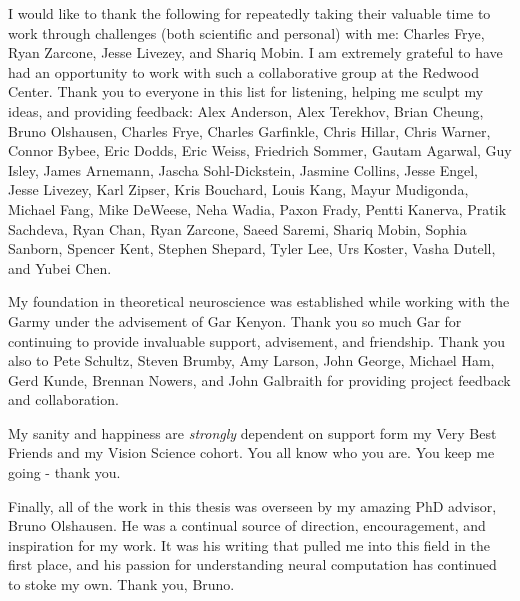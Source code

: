 \documentclass{ucbthesis}
\begin{document}
\begin{frontmatter}
\begin{acknowledgements}
I would like to thank the following for repeatedly taking their valuable time to work through challenges (both scientific and personal) with me: Charles Frye, Ryan Zarcone, Jesse Livezey, and Shariq Mobin. I am extremely grateful to have had an opportunity to work with such a collaborative group at the Redwood Center. Thank you to everyone in this list for listening, helping me sculpt my ideas, and providing feedback: Alex Anderson, Alex Terekhov, Brian Cheung, Bruno Olshausen, Charles Frye, Charles Garfinkle, Chris Hillar, Chris Warner, Connor Bybee, Eric Dodds, Eric Weiss, Friedrich Sommer, Gautam Agarwal, Guy Isley, James Arnemann, Jascha Sohl-Dickstein, Jasmine Collins, Jesse Engel, Jesse Livezey, Karl Zipser, Kris Bouchard, Louis Kang, Mayur Mudigonda, Michael Fang, Mike DeWeese, Neha Wadia, Paxon Frady, Pentti Kanerva, Pratik Sachdeva, Ryan Chan, Ryan Zarcone, Saeed Saremi, Shariq Mobin, Sophia Sanborn, Spencer Kent, Stephen Shepard, Tyler Lee, Urs Koster, Vasha Dutell, and Yubei Chen.

My foundation in theoretical neuroscience was established while working with the Garmy under the advisement of Gar Kenyon. Thank you so much Gar for continuing to provide invaluable support, advisement, and friendship. Thank you also to Pete Schultz, Steven Brumby, Amy Larson, John George, Michael Ham, Gerd Kunde, Brennan Nowers, and John Galbraith for providing project feedback and collaboration.

My sanity and happiness are \textit{strongly} dependent on support form my Very Best Friends and my Vision Science cohort. You all know who you are. You keep me going - thank you.

Finally, all of the work in this thesis was overseen by my amazing PhD advisor, Bruno Olshausen. He was a continual source of direction, encouragement, and inspiration for my work. It was his writing that pulled me into this field in the first place, and his passion for understanding neural computation has continued to stoke my own. Thank you, Bruno.
\end{acknowledgements}

\end{frontmatter}

\pagestyle{headings}


\label{ch:intro}

\label{ch:lca}

\label{ch:hierarchical_sc}

\label{ch:iso}

\label{ch:conclusion}


\clearpage
\printbibliography
\end{document}
